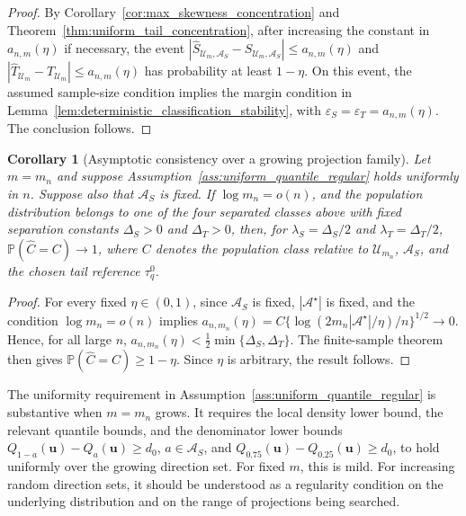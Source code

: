 \documentclass[11pt]{article}
\theoremstyle{plain}
\newtheorem{corollary}{Corollary}
\theoremstyle{definition}
\theoremstyle{remark}
\def\u{\bm{u}}
\newcommand{\Prob}{\mathbb{P}}
\begin{document}
\begin{proof}
	By Corollary~\ref{cor:max_skewness_concentration} and Theorem~\ref{thm:uniform_tail_concentration}, after increasing the constant in \(a_{n,m}(\eta)\) if necessary, the event \(|\widehat S_{\mathcal U_m,\mathcal A_S}-S_{\mathcal U_m,\mathcal A_S}|\leqslant a_{n,m}(\eta)\) and \(|\widehat T_{\mathcal U_m}-T_{\mathcal U_m}|\leqslant a_{n,m}(\eta)\) has probability at least \(1-\eta\). On this event, the assumed sample-size condition implies the margin condition in Lemma~\ref{lem:deterministic_classification_stability}, with \(\varepsilon_S=\varepsilon_T=a_{n,m}(\eta)\). The conclusion follows.
\end{proof}

\begin{corollary}[Asymptotic consistency over a growing projection family]
	\label{cor:asymptotic_four_regime_consistency}
	Let \(m=m_n\) and suppose Assumption~\ref{ass:uniform_quantile_regular} holds uniformly in \(n\). Suppose also that \(\mathcal A_S\) is fixed. If \(\log m_n=o(n)\), and the population distribution belongs to one of the four separated classes above with fixed separation constants \(\Delta_S>0\) and \(\Delta_T>0\), then, for \(\lambda_S=\Delta_S/2\) and \(\lambda_T=\Delta_T/2\), \(\Prob(\widehat C=C)\to1\), where \(C\) denotes the population class relative to \(\mathcal U_{m_n}\), \(\mathcal A_S\), and the chosen tail reference \(\tau_q^0\).
\end{corollary}

\begin{proof}
	For every fixed \(\eta\in(0,1)\), since \(\mathcal A_S\) is fixed, \(|\mathcal A^\star|\) is fixed, and the condition \(\log m_n=o(n)\) implies \(a_{n,m_n}(\eta)=C\{\log(2m_n|\mathcal A^\star|/\eta)/n\}^{1/2}\to0\). Hence, for all large \(n\), \(a_{n,m_n}(\eta)<\frac12\min\{\Delta_S,\Delta_T\}\). The finite-sample theorem then gives \(\Prob(\widehat C=C)\ge1-\eta\). Since \(\eta\) is arbitrary, the result follows.
\end{proof}

The uniformity requirement in Assumption~\ref{ass:uniform_quantile_regular} is substantive when \(m=m_n\) grows. It requires the local density lower bound, the relevant quantile bounds, and the denominator lower bounds \(Q_{1-a}(\u)-Q_a(\u)\geqslant d_0\), \(a\in\mathcal A_S\), and \(Q_{0.75}(\u)-Q_{0.25}(\u)\geqslant d_0\), to hold uniformly over the growing direction set. For fixed \(m\), this is mild. For increasing random direction sets, it should be understood as a regularity condition on the underlying distribution and on the range of projections being searched.
\end{document}
